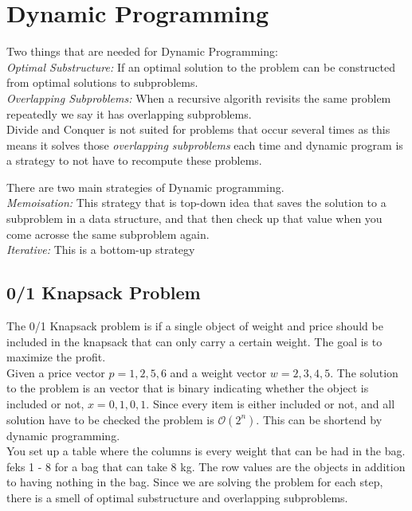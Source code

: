 \section{Dynamic Programming}

Two things that are needed for Dynamic Programming:\\

\emph{Optimal Substructure:} If an optimal solution to the problem can be constructed from optimal solutions to subproblems.\\

\emph{Overlapping Subproblems:} When a recursive algorith revisits the same problem repeatedly we say it has overlapping subproblems.\\

Divide and Conquer is not suited for problems that occur several times as this means it solves those \emph{overlapping subproblems} each time and dynamic program is a strategy to not have to recompute these problems. 

There are two main strategies of Dynamic programming.\\

\emph{Memoisation:} This strategy that is top-down idea that saves the solution to a subproblem in a data structure, and that then check up that value when you come acrosse the same subproblem again. \\

\emph{Iterative: } This is a bottom-up strategy 

\subsection{0/1 Knapsack Problem}

The 0/1 Knapsack problem is if a single object of weight and price should be included in the knapsack that can only carry a certain weight. The goal is to maximize the profit. \\

Given a price vector $p = {1, 2, 5, 6}$ and a weight vector $w = {2, 3, 4, 5}$. The solution to the problem is an vector that is binary indicating whether the object is included or not, $x = {0, 1, 0, 1}$. 
Since every item is either included or not, and all solution have to be checked the problem is $\mathcal{O}(2^n)$. This can be shortend by dynamic programming.\\

You set up a table where the columns is every weight that can be had in the bag. feks 1 - 8 for a bag that can take 8 kg. The row values are the objects in addition to having nothing in the bag. Since we are solving the problem for each step, there is a smell of optimal substructure and overlapping subproblems. 

